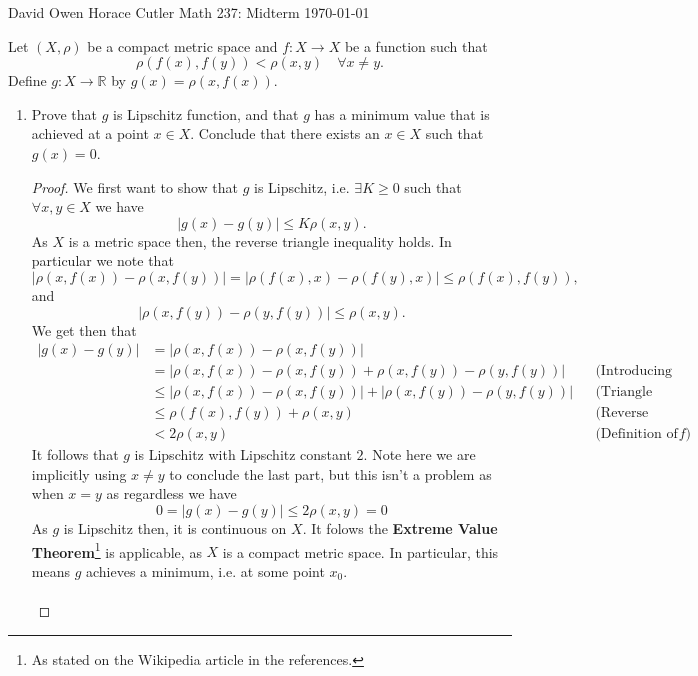 \documentclass[12pt]{article}
\newenvironment{ex}[2][Exercise]{\begin{trivlist}
\item[\hskip \labelsep {\bfseries #1}\hskip \labelsep {\bfseries #2.}]}{\end{trivlist}}
\begin{document}
\noindent David Owen Horace Cutler \hfill {\Large Math 237: Midterm} \hfill \today



\begin{ex}{1}
    Let $(X, \rho)$ be a compact metric space and $f: X \rightarrow X$ be a function such that
    $$\rho(f(x), f(y)) < \rho(x,y) \quad \forall x \neq y.$$
    Define $g : X \rightarrow \mathbb{R}$ by $g(x) = \rho(x, f(x))$. 
    \begin{enumerate}[label=(\alph*)]
        \item Prove that $g$ is Lipschitz function, and that $g$ has a minimum value that is achieved at a point $x \in X$. Conclude that there exists an $x \in X$ such that $g(x) = 0$.
        \begin{proof}
            We first want to show that $g$ is  Lipschitz, i.e. $\exists K \geq 0$ such that $\forall x, y \in X$ we have
            $$|g(x) - g(y)| \leq K\rho(x,y).$$
            As $X$ is a metric space then, the reverse triangle inequality holds. In particular we note that 
            $$|\rho(x, f(x)) - \rho(x, f(y))| = |\rho(f(x), x) - \rho(f(y), x)| \leq \rho(f(x), f(y)),$$
            and
            $$|\rho(x, f(y)) - \rho(y, f(y))| \leq \rho(x, y).$$
            We get then that 
            \begin{align*}
                |g(x) - g(y)| &= |\rho(x, f(x)) - \rho(x, f(y))| \\ 
                &= |\rho(x, f(x)) - \rho(x, f(y)) + \rho(x, f(y)) - \rho(y, f(y))| && \text{(Introducing a term)} \\
                &\leq |\rho(x, f(x)) - \rho(x, f(y))| + |\rho(x, f(y)) - \rho(y, f(y))| && \text{(Triangle inequality)} \\
                &\leq \rho(f(x), f(y)) + \rho(x, y) && \text{(Reverse triangle inequality)} \\
                &< 2\rho(x,y) && \text{(Definition of }f)
            \end{align*}
            It follows that $g$ is Lipschitz with Lipschitz constant $2$. Note here we are implicitly using $x \neq y$ to conclude the last part, but this isn't a problem as when $x = y$ as regardless we have
            $$0 = |g(x) - g(y)| \leq 2\rho(x, y) = 0$$
            As $g$ is Lipschitz then, it is continuous on $X$. It folows the \textbf{Extreme Value Theorem}\footnote{As stated on the Wikipedia article in the references.} is applicable, as $X$ is a compact metric space. In particular, this means $g$ achieves a minimum, i.e. at some point $x_0$.  \\ \\

\end{proof}
\end{enumerate}
\end{ex}
\end{document}

